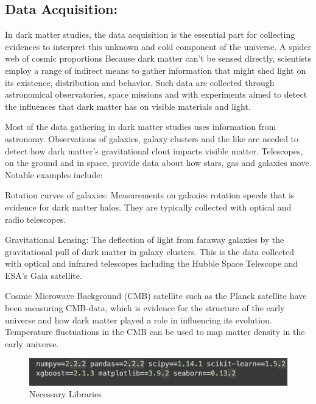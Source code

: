  

 
\subsection{Data Acquisition:}

In dark matter studies, the data acquisition is the essential part for collecting evidences to interpret this unknown and cold component of the universe. A spider web of cosmic proportions Because dark matter can’t be sensed directly, scientists employ a range of indirect means to gather information that might shed light on its existence, distribution and behavior. Such data are collected through astronomical observatories, space missions and with experiments aimed to detect the influences that dark matter has on visible materials and light.


Most of the data gathering in dark matter studies uses information from astronomy. Observations of galaxies, galaxy clusters and the like are needed to detect how dark matter’s gravitational clout impacts visible matter. Telescopes, on the ground and in space, provide data about how stars, gas and galaxies move. Notable examples include:

Rotation curves of galaxies: Measurements on galaxies rotation speeds that is evidence for dark matter halos. They are typically collected with optical and radio telescopes.

Gravitational Lensing: The deflection of light from faraway galaxies by the gravitational pull of dark matter in galaxy clusters. This is the data collected with optical and infrared telescopes including the Hubble Space Telescope and ESA's Gaia satellite.

Cosmic Microwave Background (CMB) satellite such as the Planck satellite have been measuring CMB-data, which is evidence for the structure of the early universe and how dark matter played a role in influencing its evolution. Temperature fluctuations in the CMB can be used to map matter density in the early universe.



 
\begin{figure}[H]
    \centering
    \includegraphics[scale=0.6]{Chap1/libraries.png}
    \caption{Necessary Libraries }
    \label{fig:my_label}
\end{figure}



